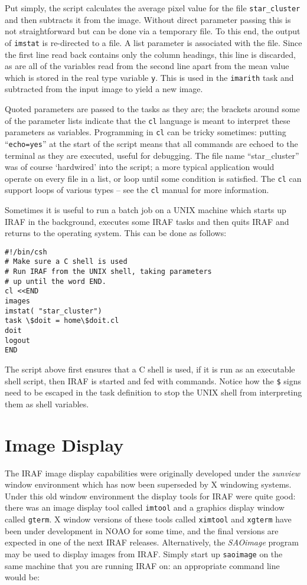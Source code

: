 Put simply, the script calculates the average pixel
value for the file {\tt star\_cluster} and then subtracts it from the
image. Without direct parameter passing this is not
straightforward but can be done via a temporary file.
To this end, the output of {\tt imstat} is
re-directed to a file.  A list parameter is associated with the file. Since
the first line read back contains only the column headings, this line
is discarded, as are all of the variables read from the second line
apart from the mean value which is stored in the real type variable
{\tt y}. This
is used in the {\tt imarith} task and subtracted from the input image to
yield a new image. 

Quoted parameters are passed to the tasks as they are; the brackets
around some of the parameter lists indicate that the {\tt cl} language is
meant to interpret these parameters as variables.  Programming in {\tt cl}
can be tricky sometimes: putting ``{\tt echo=yes}'' at the start of
the script means that all commands are echoed to the terminal as they
are executed, useful for debugging.  The file name
``star\_cluster'' was of course `hardwired' into the script; a more
typical application would operate on every file in a list, or loop
until some condition is satisfied. The {\tt cl} can support loops of various
types -- see the {\tt cl} manual for more information.

Sometimes it is useful to run a batch job on a UNIX machine which
starts up IRAF in the background, executes some IRAF tasks and then
quits IRAF and returns to the operating system. This can be done as
follows:

{\footnotesize
\begin{verbatim}
#!/bin/csh
# Make sure a C shell is used
# Run IRAF from the UNIX shell, taking parameters
# up until the word END.
cl <<END
images
imstat( "star_cluster")
task \$doit = home\$doit.cl
doit
logout
END
\end{verbatim}
}

The script above first ensures that a C shell is used, if it is run as
an executable shell script, then IRAF is started and fed with
commands. Notice how the {\tt \$} signs need to be escaped in the task
definition to stop the UNIX shell from interpreting them as shell
variables.


\section{Image Display}

The IRAF image display capabilities were originally developed under
the {\it sunview}\/ window environment which has now been superseded by
X windowing systems. Under this old window environment the
display tools for IRAF were quite good: there was an image display
tool called {\tt imtool} and a graphics display window called
{\tt gterm}. X window versions of these tools called {\tt ximtool} and
{\tt xgterm} have been under development in NOAO for some time,
and the final versions are expected in one of the next IRAF releases. 
Alternatively, the {\it SAOimage}\/ program may be used to display 
images from IRAF. Simply start up {\tt saoimage} on the same machine that 
you are running IRAF on:  an appropriate command line would be:

